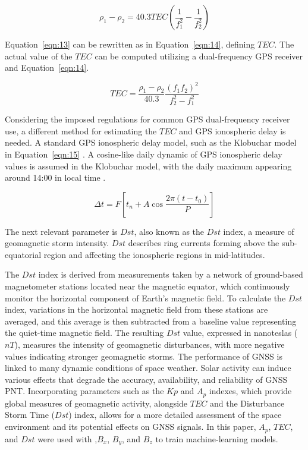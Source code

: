 \documentclass[sn-mathphys-num]{sn-jnl}%
\begin{document}
\begin{equation}
	\rho_{1} - \rho_{2} = 40.3 TEC \left( \frac{1}{f_{1}^{2}} - \frac{1}{f_{2}^{2}} \right)
	\label{eqn:13}
\end{equation}

Equation~\ref{eqn:13} can be rewritten as in Equation~\ref{eqn:14}, defining $TEC$. The actual value of the $TEC$ can be computed utilizing a dual-frequency GPS receiver and Equation~\ref{eqn:14}.

\begin{equation}
	TEC = \frac{\rho_{1} - \rho_{2}}{40.3} \frac{{\left(f_{1}f_{2}\right)}^{2}}{f_{2}^{2}-f_{1}^{2}}
	\label{eqn:14}
\end{equation}

Considering the imposed regulations for common GPS dual-frequency receiver use, a different method for estimating the $TEC$ and GPS ionospheric delay is needed. A standard GPS ionospheric delay model, such as the Klobuchar model in Equation~\ref{eqn:15} \cite{enge1994global,spilker1996global}. A cosine-like daily dynamic of GPS ionospheric delay values is assumed in the Klobuchar model, with the daily maximum appearing around 14:00 in local time \cite{klobuchar1987ionospheric}.

\begin{equation}
	\Delta t = F \left[ t_{n} + A \cos \frac{2\pi\left(t-t_{0}\right)}{P} \right]
	\label{eqn:15}
\end{equation}

The next relevant parameter is $Dst$, also known as the $Dst$ index, a measure of geomagnetic storm intensity. $Dst$ describes ring currents forming above the sub-equatorial region and affecting the ionospheric regions in mid-latitudes.

The $Dst$ index is derived from measurements taken by a network of ground-based magnetometer stations located near the magnetic equator, which continuously monitor the horizontal component of Earth's magnetic field. To calculate the $Dst$ index, variations in the horizontal magnetic field from these stations are averaged, and this average is then subtracted from a baseline value representing the quiet-time magnetic field. The resulting $Dst$ value, expressed in nanoteslas ($nT$), measures the intensity of geomagnetic disturbances, with more negative values indicating stronger geomagnetic storms. The performance of GNSS is linked to many dynamic conditions of space weather. Solar activity can induce various effects that degrade the accuracy, availability, and reliability of GNSS PNT. Incorporating parameters such as the $Kp$ and $A_p$ indexes, which provide global measures of geomagnetic activity, alongside $TEC$ and the Disturbance Storm Time ($Dst$) index, allows for a more detailed assessment of the space environment and its potential effects on GNSS signals. In this paper, $A_p$, $TEC$, and $Dst$ were used with ,$B_x$, $B_y$, and $B_z$ to train machine-learning models.
\end{document}
